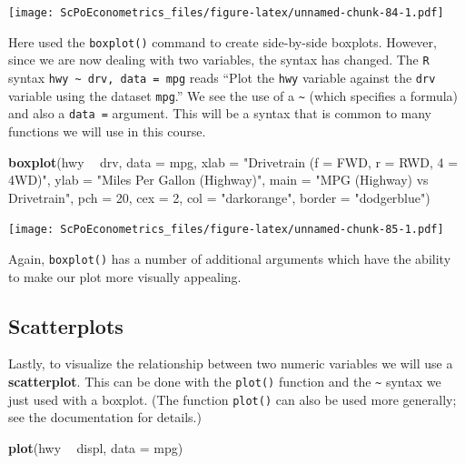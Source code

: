 \documentclass[]{book}
\newenvironment{Shaded}{\begin{snugshade}}{\end{snugshade}}
\newcommand{\KeywordTok}[1]{\textcolor[rgb]{0.13,0.29,0.53}{\textbf{#1}}}
\newcommand{\DataTypeTok}[1]{\textcolor[rgb]{0.13,0.29,0.53}{#1}}
\newcommand{\DecValTok}[1]{\textcolor[rgb]{0.00,0.00,0.81}{#1}}
\newcommand{\StringTok}[1]{\textcolor[rgb]{0.31,0.60,0.02}{#1}}
\newcommand{\OperatorTok}[1]{\textcolor[rgb]{0.81,0.36,0.00}{\textbf{#1}}}
\newcommand{\NormalTok}[1]{#1}
\theoremstyle{definition}
\theoremstyle{definition}
\theoremstyle{definition}
\theoremstyle{remark}
\begin{document}
\texttt{[image: ScPoEconometrics\_files/figure-latex/unnamed-chunk-84-1.pdf]}

Here used the \texttt{boxplot()} command to create side-by-side
boxplots. However, since we are now dealing with two variables, the
syntax has changed. The \texttt{R} syntax
\texttt{hwy\ \textasciitilde{}\ drv,\ data\ =\ mpg} reads ``Plot the
\texttt{hwy} variable against the \texttt{drv} variable using the
dataset \texttt{mpg}.'' We see the use of a \texttt{\textasciitilde{}}
(which specifies a formula) and also a \texttt{data\ =} argument. This
will be a syntax that is common to many functions we will use in this
course.

\begin{Shaded}
\begin{Highlighting}[]
\KeywordTok{boxplot}\NormalTok{(hwy }\OperatorTok{~}\StringTok{ }\NormalTok{drv, }\DataTypeTok{data =}\NormalTok{ mpg,}
     \DataTypeTok{xlab   =} \StringTok{"Drivetrain (f = FWD, r = RWD, 4 = 4WD)"}\NormalTok{,}
     \DataTypeTok{ylab   =} \StringTok{"Miles Per Gallon (Highway)"}\NormalTok{,}
     \DataTypeTok{main   =} \StringTok{"MPG (Highway) vs Drivetrain"}\NormalTok{,}
     \DataTypeTok{pch    =} \DecValTok{20}\NormalTok{,}
     \DataTypeTok{cex    =} \DecValTok{2}\NormalTok{,}
     \DataTypeTok{col    =} \StringTok{"darkorange"}\NormalTok{,}
     \DataTypeTok{border =} \StringTok{"dodgerblue"}\NormalTok{)}
\end{Highlighting}
\end{Shaded}

\texttt{[image: ScPoEconometrics\_files/figure-latex/unnamed-chunk-85-1.pdf]}

Again, \texttt{boxplot()} has a number of additional arguments which
have the ability to make our plot more visually appealing.

\subsection{Scatterplots}\label{scatterplots}

Lastly, to visualize the relationship between two numeric variables we
will use a \textbf{scatterplot}. This can be done with the
\texttt{plot()} function and the \texttt{\textasciitilde{}} syntax we
just used with a boxplot. (The function \texttt{plot()} can also be used
more generally; see the documentation for details.)

\begin{Shaded}
\begin{Highlighting}[]
\KeywordTok{plot}\NormalTok{(hwy }\OperatorTok{~}\StringTok{ }\NormalTok{displ, }\DataTypeTok{data =}\NormalTok{ mpg)}
\end{Highlighting}
\end{Shaded}
\end{document}
